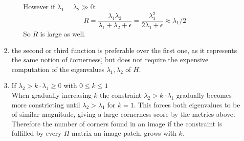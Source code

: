 \documentclass[12pt,letterpaper]{article}
\begin{document}
\begin{enumerate}[label=(\alph*)]
\begin{enumerate}
	      	      However if \( \lambda_1 = \lambda_2 \gg 0 \):
	      	      \begin{equation}
	      	      	R 
	      	      	= \frac{\lambda_1 \lambda_2}{\lambda_1 + \lambda_2 + \epsilon}
	      	      	= \frac{\lambda_1^2}{2\lambda_1 + \epsilon}
	      	      	\approx \lambda_1 / 2
	      	      \end{equation}
	      	      So \( R \) is large as well.
	      \end{enumerate}
	\item the second or third function is preferable over the first one, as it represents the same notion of \"cornerness\", 
	      but does not require the expensive computation of the eigenvalues \( \lambda_1, \lambda_2 \) of \( H \).
	\item If \( \lambda_2 > k \cdot \lambda_1 \geq 0 \) with \( 0 \leq k \leq 1 \) \\
	      When gradually increasing \( k \) the constraint \( \lambda_2 > k \cdot \lambda_1 \) gradually becomes more
	      constricting until \( \lambda_2 > \lambda_1 \) for \( k = 1 \). This forces both eigenvalues 
	      to be of similar magnitude, giving a large cornerness score by the metrics above.
	      Therefore the number of corners found in an image if the constraint is fulfilled by every \( H \) matrix an image patch,
	      grows with \( k \).
\end{enumerate}
\end{document}
